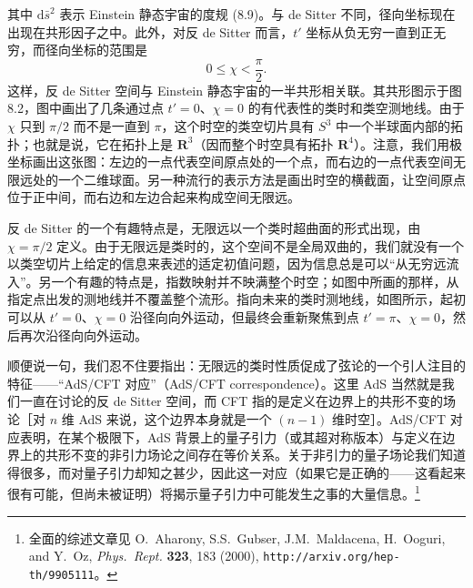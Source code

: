 其中 $\mathrm{d}\bar{s}^2$ 表示 Einstein 静态宇宙的度规 (8.9)。与 de Sitter 不同，径向坐标现在出现在共形因子之中。此外，对反 de Sitter 而言，$t'$ 坐标从负无穷一直到正无穷，而径向坐标的范围是
\begin{equation*}
0 \leq \chi < \frac{\pi}{2}.
\tag{8.16}
\end{equation*}
这样，反 de Sitter 空间与 Einstein 静态宇宙的一半共形相关联。其共形图示于图 8.2，图中画出了几条通过点 $t'=0$、$\chi=0$ 的有代表性的类时和类空测地线。由于 $\chi$ 只到 $\pi/2$ 而不是一直到 $\pi$，这个时空的类空切片具有 $S^3$ 中一个半球面内部的拓扑；也就是说，它在拓扑上是 $\mathbf{R}^3$（因而整个时空具有拓扑 $\mathbf{R}^4$）。注意，我们用极坐标画出这张图：左边的一点代表空间原点处的一个点，而右边的一点代表空间无限远处的一个二维球面。另一种流行的表示方法是画出时空的横截面，让空间原点位于正中间，而右边和左边合起来构成空间无限远。

反 de Sitter 的一个有趣特点是，无限远以一个类时超曲面的形式出现，由 $\chi=\pi/2$ 定义。由于无限远是类时的，这个空间不是全局双曲的，我们就没有一个以类空切片上给定的信息来表述的适定初值问题，因为信息总是可以“从无穷远流入”。另一个有趣的特点是，指数映射并不映满整个时空；如图中所画的那样，从指定点出发的测地线并不覆盖整个流形。指向未来的类时测地线，如图所示，起初可以从 $t'=0$、$\chi=0$ 沿径向向外运动，但最终会重新聚焦到点 $t'=\pi$、$\chi=0$，然后再次沿径向向外运动。

顺便说一句，我们忍不住要指出：无限远的类时性质促成了弦论的一个引人注目的特征——“AdS/CFT 对应”（AdS/CFT correspondence）。这里 AdS 当然就是我们一直在讨论的反 de Sitter 空间，而 CFT 指的是定义在边界上的共形不变的场论［对 $n$ 维 AdS 来说，这个边界本身就是一个 $(n-1)$ 维时空］。AdS/CFT 对应表明，在某个极限下，AdS 背景上的量子引力（或其超对称版本）与定义在边界上的共形不变的非引力场论之间存在等价关系。关于非引力的量子场论我们知道得很多，而对量子引力却知之甚少，因此这一对应（如果它是正确的——这看起来很有可能，但尚未被证明）将揭示量子引力中可能发生之事的大量信息。\footnote{全面的综述文章见 O.~Aharony, S.S.~Gubser, J.M.~Maldacena, H.~Ooguri, and Y.~Oz, \emph{Phys.\ Rept.} \textbf{323}, 183 (2000), \texttt{http://arxiv.org/hep-th/9905111}。}

